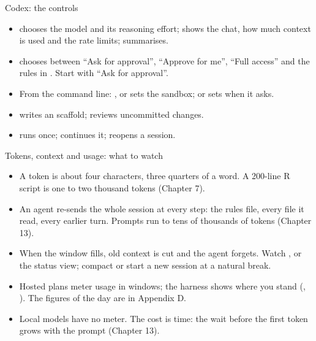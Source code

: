 \documentclass[11pt,aspectratio=169]{beamer}
\begin{document}
\begin{frame}{Codex: the controls}
  \begin{itemize}
    \item {} chooses the model and its reasoning effort;
       shows the chat, how much context is used and the rate
      limits;  summarises.
    \item {} chooses between ``Ask for approval'',
      ``Approve for me'', ``Full access'' and the rules in
      . Start with ``Ask for approval''.
    \item From the command line: , 
      or  sets the sandbox;  or
       sets when it asks.
    \item {} writes an  scaffold; 
      reviews uncommitted changes.
    \item {} runs once;  continues it;  reopens a session.
  \end{itemize}
\end{frame}

\begin{frame}{Tokens, context and usage: what to watch}
  \begin{itemize}
    \item A token is about four characters, three quarters of a word. A
      200-line R script is one to two thousand tokens (Chapter 7).
    \item An agent re-sends the whole session at every step: the rules file,
      every file it read, every earlier turn. Prompts run to tens of
      thousands of tokens (Chapter 13).
    \item When the window fills, old context is cut and the agent forgets.
      Watch ,  or the status view; compact or
      start a new session at a natural break.
    \item Hosted plans meter usage in windows; the harness shows where you
      stand (, ). The figures of the day are in
      Appendix D.
    \item Local models have no meter. The cost is time: the wait before the
      first token grows with the prompt (Chapter 13).
  \end{itemize}
\end{frame}
\end{document}
